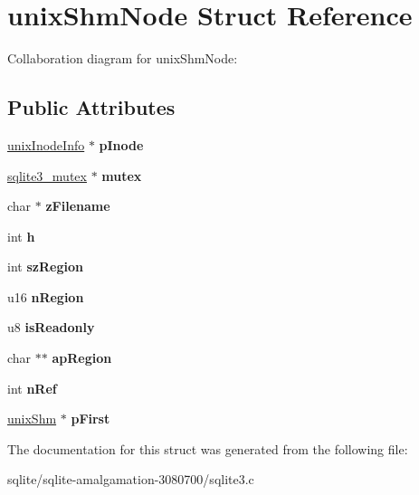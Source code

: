 \hypertarget{structunix_shm_node}{\section{unix\+Shm\+Node Struct Reference}
\label{structunix_shm_node}
}


Collaboration diagram for unix\+Shm\+Node\+:
\subsection*{Public Attributes}
\begin{DoxyCompactItemize}
\item 
\hypertarget{structunix_shm_node_ab6bc1cf84d65887a3395da6406843817}{\hyperlink{structunix_inode_info}{unix\+Inode\+Info} $\ast$ {\bfseries p\+Inode}}\label{structunix_shm_node_ab6bc1cf84d65887a3395da6406843817}

\item 
\hypertarget{structunix_shm_node_aa90850530f48fec6f2a872874f8ddf1f}{\hyperlink{structsqlite3__mutex}{sqlite3\+\_\+mutex} $\ast$ {\bfseries mutex}}\label{structunix_shm_node_aa90850530f48fec6f2a872874f8ddf1f}

\item 
\hypertarget{structunix_shm_node_a188c3bc5fcb4666ad0817ac093e7505d}{char $\ast$ {\bfseries z\+Filename}}\label{structunix_shm_node_a188c3bc5fcb4666ad0817ac093e7505d}

\item 
\hypertarget{structunix_shm_node_a9cd93c8052eb47f257e2d752e8f1fdba}{int {\bfseries h}}\label{structunix_shm_node_a9cd93c8052eb47f257e2d752e8f1fdba}

\item 
\hypertarget{structunix_shm_node_ae8126f9db70a758c2f340ec06869e02b}{int {\bfseries sz\+Region}}\label{structunix_shm_node_ae8126f9db70a758c2f340ec06869e02b}

\item 
\hypertarget{structunix_shm_node_aaf1fceb640b3959424403885c0419a46}{u16 {\bfseries n\+Region}}\label{structunix_shm_node_aaf1fceb640b3959424403885c0419a46}

\item 
\hypertarget{structunix_shm_node_ad241b0a85f01110310cea91aa38fccb2}{u8 {\bfseries is\+Readonly}}\label{structunix_shm_node_ad241b0a85f01110310cea91aa38fccb2}

\item 
\hypertarget{structunix_shm_node_a8eff550f9b10a2de463e9874f84efc5e}{char $\ast$$\ast$ {\bfseries ap\+Region}}\label{structunix_shm_node_a8eff550f9b10a2de463e9874f84efc5e}

\item 
\hypertarget{structunix_shm_node_a6d9f0c9dec3f6710cb09c90723a8284b}{int {\bfseries n\+Ref}}\label{structunix_shm_node_a6d9f0c9dec3f6710cb09c90723a8284b}

\item 
\hypertarget{structunix_shm_node_a0ddd6c4625acf5994a60b0c368bc665e}{\hyperlink{structunix_shm}{unix\+Shm} $\ast$ {\bfseries p\+First}}\label{structunix_shm_node_a0ddd6c4625acf5994a60b0c368bc665e}

\end{DoxyCompactItemize}


The documentation for this struct was generated from the following file\+:\begin{DoxyCompactItemize}
\item 
sqlite/sqlite-\/amalgamation-\/3080700/sqlite3.\+c\end{DoxyCompactItemize}
